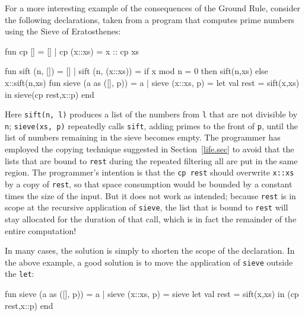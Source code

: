\documentclass[12pt]{book}
\begin{document}
For a more interesting example of the consequences of the Ground Rule, consider
the following declarations, taken from a program that computes prime numbers
using the
%
%
Sieve of Eratosthenes:
\begin{smlcode}
  fun cp [] = []
    | cp (x::xs) = x :: cp xs

  fun sift (n, []) = []
    | sift (n, (x::xs)) = if x mod n = 0 then sift(n,xs)
                          else x::sift(n,xs)
  fun sieve (a as ([], p)) = a
    | sieve (x::xs, p) = let val rest = sift(x,xs)
                         in sieve(cp rest,x::p)
                         end
\end{smlcode}
Here \lstinline{sift(n, l)} produces a list of the numbers from \lstinline{l}
that are not divisible by \lstinline{n}; \lstinline{sieve(xs, p)} repeatedly
calls \lstinline{sift}, adding primes to the front of \lstinline{p}, until the
list of numbers remaining in the sieve becomes empty. The programmer has
employed the copying technique suggested in Section~\ref{life.sec} to avoid that
the lists that are bound to \lstinline{rest} during the repeated filtering all
are put in the same region. The programmer's intention is that the \lstinline{cp rest}
should overwrite \lstinline{x::xs} by a copy of \lstinline{rest}, so that
space consumption would be bounded by a constant times the size of the input.
But it does not work as intended; because \lstinline{rest} is in scope at the
recursive application of \lstinline{sieve}, the list that is bound to
\lstinline{rest} will stay allocated for the duration of that call, which is in
fact the remainder of the entire computation!

In many cases, the solution is simply to shorten the scope of the declaration.
In the above example, a good solution is to move the application of
\lstinline{sieve} outside the \lstinline{let}:
\begin{smlcode}
  fun sieve (a as ([], p)) = a
    | sieve (x::xs, p) =
          sieve let val rest = sift(x,xs)
                in (cp rest,x::p)
                end
\end{smlcode}
\end{document}
